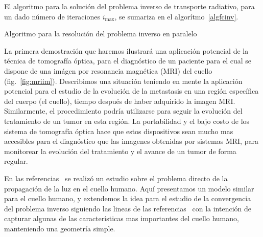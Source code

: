 El algoritmo para la solución del problema inverso de transporte radiativo, 
para un dado número de iteraciones $i_{\text{max}}$, se sumariza en el 
algorítmo~\ref{algfcinv}.
\begin{algorithm}
\caption{Algoritmo para la resolución del problema inverso en paralelo}
\label{algfcinv}
\end{algorithm}
La primera demostración que haremos ilustrará una aplicación potencial 
de la técnica de tomografía óptica, para el diagnóstico 
de un paciente para el cual se dispone de una imágen por resonancia magnética (MRI)
del cuello (fig.~\ref{fig:mriim}). Describimos una situación teniendo 
en mente la aplicación potencial para el estudio de la evolución de la metastasis 
en una región específica del cuerpo (el cuello), tiempo después 
de haber adquirido la imagen MRI. Similarmente, el procedimiento 
podría utilizarse para seguir la evolución del tratamiento de un tumor en esta región. 
La portabilidad y el bajo costo de los sistema de tomografía óptica 
hace que estos dispositivos sean mucho mas accesibles para el diagnóstico 
que las imagenes obtenidas por sistemas MRI, para monitorear 
la evolución del tratamiento y el avance de un tumor de forma regular. 

En las referencias~\cite{Fujii2016b,Fujii2016} se realizó un estudio sobre el problema directo de la propagación de la luz en el cuello humano. Aquí presentamos un modelo similar 
para el cuello humano, y extendemos la idea para el estudio 
de la convergencia del problema inverso siguiendo las lineas de las referencias~\cite{Fujii2016b,Fujii2016} con la intención de capturar 
algunas de las características mas importantes del cuello humano, 
manteniendo una geometría simple. 

